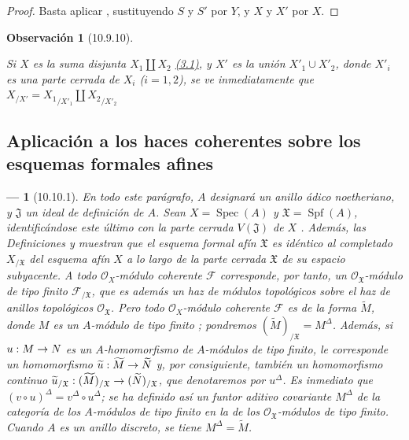 \documentclass[oneside]{amsart}
\theoremstyle{ega-env-style}
\newtheorem*{env}{---}
\theoremstyle{ega-thm-env-style}
\theoremstyle{ega-defn-env-style}
\newtheorem*{remark}{Observación}
\renewcommand{\to}{\mathchoice{\longrightarrow}{\rightarrow}{\rightarrow}{\rightarrow}}
\newcommand{\oldpage}[2][]{{\marginnote{\normalfont{\textbf{#1}~|~#2}}}\ignorespaces}
\let\EGAOriginalLabel\label
\renewcommand{\label}[1]{\phantomsection\EGAOriginalLabel{#1}}
\begin{document}
\begin{proof}
Basta aplicar , sustituyendo $S$ y $S'$ por $Y$, y $X$ y $X'$ por $X$.
\end{proof}


\oldpage[I]{201}
\begin{remark}[10.9.10]
\label{I.10.9.10}

Si $X$ es la suma disjunta $X_1\amalg X_2$ \hyperref[subsection:I.3.1]{(3.1)}, y $X'$ es la unión $X'_1\cup X'_2$, donde $X'_i$ es una parte cerrada de $X_i$ ($i=1,2$), se ve inmediatamente que
$X_{/X'}={X_1}_{/X'_1}\amalg {X_2}_{/X'_2}$
\end{remark}

\subsection{Aplicación a los haces coherentes sobre los esquemas formales afines}
\label{subsection:I.10.10}

\begin{env}[10.10.1]
\label{I.10.10.1}
En todo este parágrafo, $A$ designará un \emph{anillo ádico noetheriano}, y $\mathfrak{J}$ un ideal de definición de $A$.
Sean $X=\operatorname{Spec}(A)$ y $\mathfrak{X}=\operatorname{Spf}(A)$, identificándose este último con la parte cerrada $V(\mathfrak{J})$ de $X$ .
Además, las Definiciones  y  muestran que el \emph{esquema formal afín $\mathfrak{X}$} es idéntico al \emph{completado $X_{/\mathfrak{X}}$} del esquema afín $X$ a lo largo de la parte cerrada $\mathfrak{X}$ de su espacio subyacente.
A todo $\mathscr{O}_X$-módulo coherente $\mathscr{F}$ corresponde, por tanto, un $\mathscr{O}_{\mathfrak{X}}$-módulo de tipo finito $\mathscr{F}_{/\mathfrak{X}}$, que es además un haz de módulos topológicos sobre el haz de anillos topológicos $\mathscr{O}_{\mathfrak{X}}$.
Pero todo $\mathscr{O}_X$-módulo coherente $\mathscr{F}$ es de la forma $\widetilde M$, donde $M$ es un $A$-módulo de tipo finito ; pondremos $(\widetilde M)_{/\mathfrak{X}}=M^\Delta$.
Además, si $u:M\to N$ es un $A$-homomorfismo de $A$-módulos de tipo finito, le corresponde un homomorfismo $\widetilde u:\widetilde M\to\widetilde N$ y, por consiguiente, también un homomorfismo continuo $\widetilde u_{/\mathfrak{X}}:(\widetilde M)_{/\mathfrak{X}}\to
(\widetilde N)_{/\mathfrak{X}}$, que denotaremos por $u^\Delta$.
Es inmediato que $(v\circ u)^\Delta=v^\Delta\circ u^\Delta$; se ha definido así un \emph{funtor aditivo covariante $M^\Delta$} de la categoría de los $A$-módulos de tipo finito en la de los $\mathscr{O}_{\mathfrak{X}}$-módulos de tipo finito.
Cuando $A$ es un anillo \emph{discreto}, se tiene $M^\Delta=\widetilde M$.
\end{env}
\end{document}
